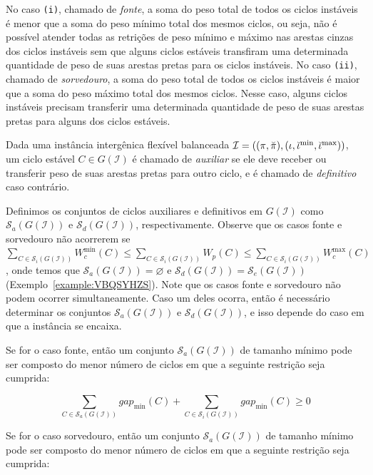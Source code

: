 No caso \texttt{(i)}, chamado de \emph{fonte}, a soma do peso total de todos os ciclos instáveis é menor que a soma do peso mínimo total dos mesmos ciclos, ou seja, não é possível atender todas as retrições de peso mínimo e máximo nas arestas cinzas dos ciclos instáveis sem que alguns ciclos estáveis transfiram uma determinada quantidade de peso de suas arestas pretas para os ciclos instáveis. No caso \texttt{(ii)}, chamado de \emph{sorvedouro}, a soma do peso total de todos os ciclos instáveis é maior que a soma do peso máximo total dos mesmos ciclos. Nesse caso, alguns ciclos instáveis precisam transferir uma determinada quantidade de peso de suas arestas pretas para alguns dos ciclos estáveis.

\begin{definition}
Dada uma instância intergênica flexível balanceada $\mathcal{I} = ((\pi,\breve\pi),\break(\iota,\breve\iota^{\min},\breve\iota^{\max}))$, um ciclo estável $C \in G(\mathcal{I})$ é chamado de \emph{auxiliar} se ele deve receber ou transferir peso de suas arestas pretas para outro ciclo, e é chamado de \emph{definitivo} caso contrário.
\end{definition}

Definimos os conjuntos de ciclos auxiliares e definitivos em $G(\mathcal{I})$ como $\mathcal{S}_a(G(\mathcal{I}))$ e $\mathcal{S}_d(G(\mathcal{I}))$, respectivamente. Observe que os casos fonte e sorvedouro não acorrerem se $\sum_{C \in \mathcal{S}_i(G(\mathcal{I}))} W^{\min}_c(C) \le \sum_{C \in \mathcal{S}_i(G(\mathcal{I}))} W_p(C) \le \sum_{C \in \mathcal{S}_i(G(\mathcal{I}))} W^{\max}_c(C)$, onde temos que $\mathcal{S}_a(G(\mathcal{I})) = \varnothing$ e $\mathcal{S}_d(G(\mathcal{I})) = \mathcal{S}_e(G(\mathcal{I}))$ (Exemplo~\ref{example:VBQSYHZS}). Note que os casos fonte e sorvedouro não podem ocorrer simultaneamente. Caso um deles ocorra, então é necessário determinar os conjuntos $\mathcal{S}_a(G(\mathcal{I}))$ e $\mathcal{S}_d(G(\mathcal{I}))$, e isso depende do caso em que a instância se encaixa. 

Se for o caso fonte, então um conjunto $\mathcal{S}_a(G(\mathcal{I}))$ de tamanho mínimo pode ser composto do menor número de ciclos em que a seguinte restrição seja cumprida:

$$\sum_{C \in \mathcal{S}_a(G(\mathcal{I}))} gap_{\min}(C) + \sum_{C \in \mathcal{S}_i(G(\mathcal{I}))} gap_{\min}(C) \ge 0$$

Se for o caso sorvedouro, então um conjunto $\mathcal{S}_a(G(\mathcal{I}))$ de tamanho mínimo pode ser composto do menor número de ciclos em que a seguinte restrição seja cumprida:

